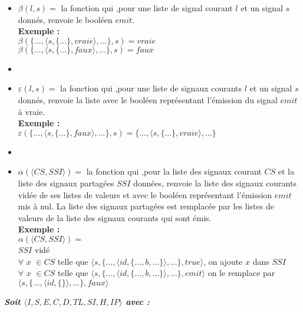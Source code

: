 \documentclass[10pt,a4paper]{article}
\begin{document}
\begin{itemize}
					\item[] $\beta(l,s) =$ la fonction qui ,pour une liste de signal courant $l$ et un signal $s$ donnés, renvoie le booléen $emit$.
					\\\textbf{Exemple :}
					\\ $\beta(\{...,\langle s,\{...\},vraie\rangle,...\},s) = vraie$\\
					$\beta(\{...,\langle s,\{...\},faux\rangle,...\},s) = faux$
					\item[] 
					\item[] $\varepsilon(l,s) =$ la fonction qui ,pour une liste de signaux courants $l$ et un signal $s$ donnés, renvoie la liste avec le booléen représentant l'émission du signal $emit$ à vraie.
					\\\textbf{Exemple :}
					\\ $\varepsilon(\{...,\langle s,\{...\},faux\rangle,...\},s) = \{...,\langle s,\{...\},vraie\rangle,...\}$
					\item[] 
					
					\item[] $\alpha(\langle CS,SSI\rangle) =$ la fonction qui ,pour la liste des signaux courant $CS$ et la liste des signaux partagées $SSI$ données, renvoie la liste des signaux courants vidée de ses listes de valeurs et avec le booléen représentant l'émission $emit$ mis à nul. La liste des signaux partagées est remplacée par les listes de valeurs de la liste des signaux courants qui sont émis.
					\\\textbf{Exemple :}
					\\ $\alpha(\langle CS,SSI\rangle) =$
					\\ $SSI$ vidé
					\\ $\forall$ $x$ $\in CS$ telle que $\langle s,\{...,\langle id,\{...,b,...\}\rangle,...\},true\rangle$, on ajoute $x$ dans $SSI$
					\\ $\forall$ $x$ $\in CS$ telle que $\langle s,\{...,\langle id,\{...,b,...\}\rangle,...\},emit\rangle$ on le remplace par $\langle s,\{...,\langle id,\{\}\rangle,...\},faux\rangle$  
				\end{itemize}
				\newpage
		
		
					
				\textbf{\textit{Soit $\langle I,S,E,C,D,TL,SI,H,IP\rangle$ avec :}}
					
\end{document}
